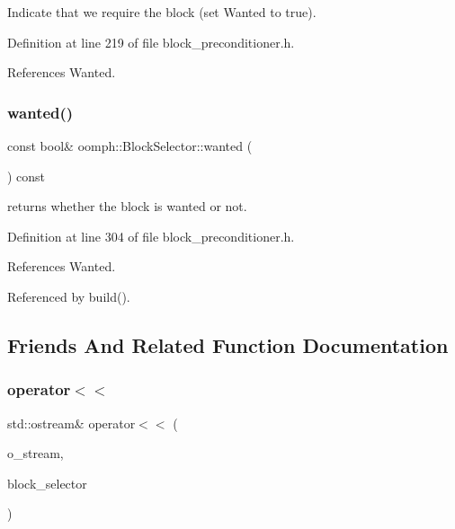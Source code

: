 Indicate that we require the block (set Wanted to true). 



Definition at line 219 of file block\+\_\+preconditioner.\+h.



References Wanted.

\mbox{\label{classoomph_1_1BlockSelector_aceece28b03cdc41a43205603380126b9}} 
\subsubsection{\texorpdfstring{wanted()}{wanted()}}
{\footnotesize\ttfamily const bool\& oomph\+::\+Block\+Selector\+::wanted (\begin{DoxyParamCaption}{ }\end{DoxyParamCaption}) const\hspace{0.3cm}{\ttfamily [inline]}}



returns whether the block is wanted or not. 



Definition at line 304 of file block\+\_\+preconditioner.\+h.



References Wanted.



Referenced by build().



\subsection{Friends And Related Function Documentation}
\mbox{\label{classoomph_1_1BlockSelector_aae471ca00fb73dad738500975f46071b}} 
\subsubsection{\texorpdfstring{operator$<$$<$}{operator<<}}
{\footnotesize\ttfamily std\+::ostream\& operator$<$$<$ (\begin{DoxyParamCaption}\item[{std\+::ostream \&}]{o\+\_\+stream,  }\item[{const \hyperlink{classoomph_1_1BlockSelector}{Block\+Selector} \&}]{block\+\_\+selector }\end{DoxyParamCaption})\hspace{0.3cm}{\ttfamily [friend]}}



